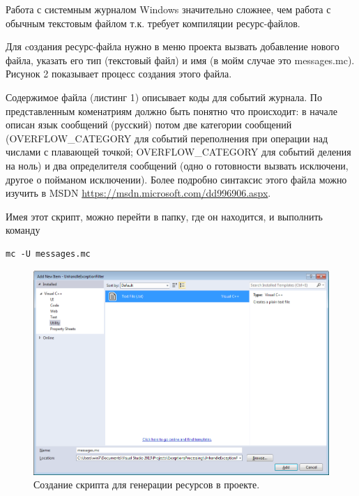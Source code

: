 \documentclass[a4paper, 12pt]{report}		%
\begin{document}
Работа с системным журналом Windows значительно сложнее, чем работа с обычным текстовым файлом т.к. требует компиляции ресурс-файлов.

Для cоздания ресурс-файла нужно в меню проекта вызвать добавление нового файла, указать его тип (текстовый файл) и имя (в мойм случае это messages.mc). Рисунок 2 показывает процесс создания этого файла.

Содержимое файла (листинг 1) описывает коды для событий журнала. По представленным коменатриям должно быть понятно что происходит: в начале описан язык сообщений (русский) потом две категории сообщений (OVERFLOW\_CATEGORY для событий переполнения при операции над числами с плавающей точкой; OVERFLOW\_CATEGORY для событий деления на ноль) и два определителя сообщений (одно о готовности вызвать исключени, другое о пойманом исключении). Более подробно синтаксис этого файла можно изучить в MSDN \url{https://msdn.microsoft.com/dd996906.aspx}.



Имея этот скрипт, можно перейти в папку, где он находится, и выполнить команду 

\begin{verbatim}
mc -U messages.mc
\end{verbatim}

\begin{figure}[h!]
\centering
\includegraphics[scale=0.65]{res/message_property0}
\caption{Создание скрипта для генерации ресурсов в проекте.}
\end{figure}
\end{document}
